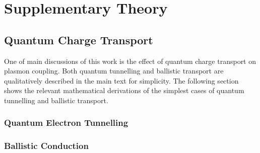 \documentclass[12pt, a4paper, twoside]{book}
\begin{document}
\chapter{Supplementary Theory}




\section{Quantum Charge Transport}

One of main discussions of this work is the effect of quantum charge transport on plasmon coupling. Both quantum tunnelling and ballistic transport are qualitatively described in the main text for simplicity. The following section shows the relevant mathematical derivations of the simplest cases of quantum tunnelling and ballistic transport.

\subsection{Quantum Electron Tunnelling}

\subsection{Ballistic Conduction}
\end{document}
